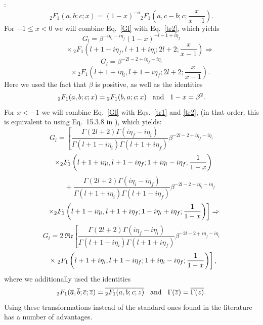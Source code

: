 \documentclass[useAMS,usenatbib]{mn2e}
\begin{document}
\citet{AS72}:
\begin{equation}
\label{tr2}
{}_2F_1(a,b;c;x) = (1-x)^{-a} {}_2F_1\left(a,c-b;c;\frac{x}{x-1}\right).
\end{equation}
For $-1 \leq x < 0$ we will combine Eq.~\ref{Gl} with Eq.~\ref{tr2}, which
yields
\[ G_l = \beta^{-i\eta_i-i\eta_f} (1-x)^{-l-1+i\eta_f} \]
\[
\phantom{G_l =} \times {}_2F_1\left( l+1-i\eta_f, l+1+i\eta_i; 2l+2; \frac{x}{x-1}\right) \Rightarrow
\]
\[ G_l = \beta^{-2l-2+i\eta_f-i\eta_i} \]
\begin{equation}
\label{gff1}
\phantom{G_l =} \times {}_2F_1\left( l+1+i\eta_i, l+1-i\eta_f; 2l+2; \frac{x}{x-1}\right).
\end{equation}
Here we used the fact that $\beta$ is positive, as well as the identities
\[ {}_2F_1(a,b;c;x) = {}_2F_1(b,a;c;x) \hspace{3mm} {\rm and} \hspace{3mm} 1-x = \beta^2. \]
For $x < -1$ we will combine Eq.~\ref{Gl} with Eqs.~\ref{tr1} and \ref{tr2},
(in that order, this is equivalent to using Eq.~15.3.8 in \citealp{AS72}),
which yields:
\[
G_l = \left[ \frac{\Gamma(2l+2)\Gamma(i\eta_f-i\eta_i)}{\Gamma(l+1-i\eta_i)\Gamma(l+1+i\eta_f)}
\beta^{-2l-2+i\eta_f-i\eta_i} \right.
\]
\[
\hspace{2mm} \times {}_2F_1\left( l+1+i\eta_i, l+1-i\eta_f; 1+i\eta_i-i\eta_f; \frac{1}{1-x} \right)
\]
\[
\phantom{G_l =} + \frac{\Gamma(2l+2)\Gamma(i\eta_i-i\eta_f)}{\Gamma(l+1+i\eta_i)\Gamma(l+1-i\eta_f)}
\beta^{-2l-2+i\eta_i-i\eta_f}
\]
\[
\hspace{2mm} \left. \times {}_2F_1\left( l+1-i\eta_i, l+1+i\eta_f; 1-i\eta_i+i\eta_f; \frac{1}{1-x}\right) \right] \Rightarrow
\]
\[
G_l = 2 \, \mathfrak{Re} \left[ \frac{\Gamma(2l+2)\Gamma(i\eta_f-i\eta_i)}{\Gamma(l+1-i\eta_i)\Gamma(l+1+i\eta_f)}
\beta^{-2l-2+i\eta_f-i\eta_i} \right.
\]
\begin{equation}
\label{gff2}
\hspace{2mm} \times \left. {}_2F_1\left( l+1+i\eta_i, l+1-i\eta_f; 1+i\eta_i-i\eta_f; \frac{1}{1-x} \right) \right],
\end{equation}
where we additionally used the identities
\[ {}_2F_1(\overline{a},\overline{b};\overline{c};\overline{z}) = \overline{{}_2F_1(a,b;c;z)}
\hspace{3mm} {\rm and} \hspace{3mm} \Gamma(\overline{z}) = \overline{\Gamma(z)}. \]
Using these transformations instead of the standard ones found in the
literature has a number of advantages.
\end{document}
